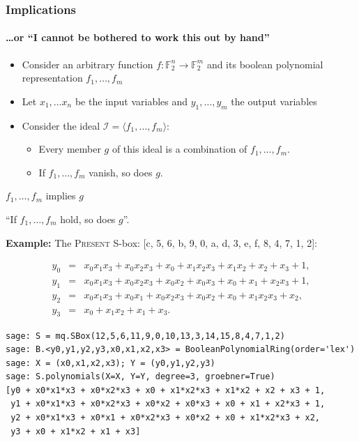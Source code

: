 \documentclass[9pt]{beamer}
\newcommand{\field}[1]{\ensuremath{\mathbb{#1}}}
\newcommand{\PRESENT}{\textsc{Present}\xspace}
\begin{document}
\begin{frame}
\frametitle{Implications}
\framesubtitle{\dots or ``I cannot be bothered to work this out by hand''}
 
\begin{itemize}
\item Consider an arbitrary function \(f: \field{F}_2^n \to \field{F}_2^m\) and its boolean polynomial representation \(f_1, \dots, f_{m}\)
\item Let \(x_{1}, \dots x_{n}\) be the input variables and \(y_{1}, \dots, y_{m}\) the output variables
\item Consider the ideal \(\mathcal{I}= \langle f_1, \dots, f_{m}\rangle\):
\begin{itemize}
\item Every member \(g\) of this ideal is a combination of \( f_1, \dots, f_{m}\).
\item If \( f_{1}, \dots, f_{m}\) vanish, so does \(g\).
\end{itemize}
\end{itemize}           
\begin{block}{\( f_1, \dots, f_{m}\) implies \(g\)}
\begin{center}
``If \(f_1, \dots, f_{m}\) hold, so does \(g\)''.
\end{center}
\end{block}

\framebreak

\textbf{Example:} The \PRESENT S-box: [c, 5, 6, b, 9, 0, a, d, 3, e, f, 8, 4, 7, 1, 2]:

\begin{eqnarray*}
y_{0} &=& x_{0} x_{1} x_{3} + x_{0} x_{2} x_{3} + x_{0} + x_{1} x_{2} x_{3} + x_{1} x_{2} + x_{2} + x_{3} + 1,\\
y_{1} &=& x_{0} x_{1} x_{3} + x_{0} x_{2} x_{3} + x_{0} x_{2} + x_{0} x_{3} + x_{0} + x_{1} + x_{2} x_{3} + 1,\\
y_{2} &=& x_{0} x_{1} x_{3} + x_{0} x_{1} + x_{0} x_{2} x_{3} + x_{0} x_{2} + x_{0} + x_{1} x_{2} x_{3} + x_{2},\\
y_{3} &=& x_{0} + x_{1} x_{2} + x_{1} + x_{3}.
\end{eqnarray*}

\begin{lstlisting}
sage: S = mq.SBox(12,5,6,11,9,0,10,13,3,14,15,8,4,7,1,2)
sage: B.<y0,y1,y2,y3,x0,x1,x2,x3> = BooleanPolynomialRing(order='lex')
sage: X = (x0,x1,x2,x3); Y = (y0,y1,y2,y3)
sage: S.polynomials(X=X, Y=Y, degree=3, groebner=True)
[y0 + x0*x1*x3 + x0*x2*x3 + x0 + x1*x2*x3 + x1*x2 + x2 + x3 + 1,
 y1 + x0*x1*x3 + x0*x2*x3 + x0*x2 + x0*x3 + x0 + x1 + x2*x3 + 1,
 y2 + x0*x1*x3 + x0*x1 + x0*x2*x3 + x0*x2 + x0 + x1*x2*x3 + x2,
 y3 + x0 + x1*x2 + x1 + x3]
\end{lstlisting}


\end{frame}
\end{document}
